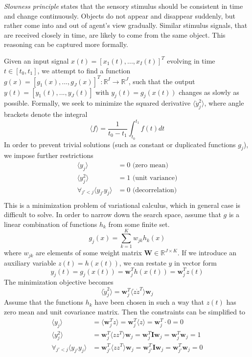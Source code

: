 \documentclass[12pt]{article}
\begin{document}
\textit{Slowness principle} states that the sensory stimulus should be consistent in time and change continuously. Objects do not appear and disappear suddenly, but rather come into and out of agent's view gradually. Similar stimulus signals, that are received closely in time, are likely to come from the same object. This reasoning can be captured more formally. 

Given an input signal $x(t)=[x_1(t),...,x_I(t)]^T$ evolving in time $t\in[t_0,t_1]$, we attempt to find a  function $g(x)=[g_1(x),...,g_J(x)]^T:\mathbb{R}^I\rightarrow \mathbb{R}^J$, such that the output $y(t)=[y_1(t),...,y_J(t)]$ with $y_j(t)=g_j(x(t))$ changes as slowly as possible. 
Formally, we seek to minimize the squared derivative $\langle \dot{y}_j^2 \rangle$,
where angle brackets denote the integral
\[\langle f \rangle = \frac{1}{t_0-t_1} \int_{t_0}^{t_1} f(t) dt\]
In order to prevent trivial solutions (such as constant or duplicated functions $g_j$), we impose further restrictions
\begin{align*}
 \langle y_j \rangle &= 0\text{ (zero mean)}	\\
 \langle y_j^2 \rangle &= 1 \text{ (unit variance)} \\
\forall_{j'< j} \langle y_{j'} y_j \rangle &= 0 \text{ (decorrelation)} \\ 
\end{align*}
This is a minimization problem of variational calculus, which in general case is difficult to solve. In order to narrow down the search space, assume that $g$ is a linear combination of functions $h_k$ from some finite set.
\[
g_j(x) = \sum_{k=1}^K w_{jk} h_k(x)
\] 
where $w_{jk}$ are elements of some weight matrix $\boldsymbol{W}\in \mathbb{R}^{J \times K}$.
If we introduce an auxiliary variable $z(t)=h(x(t))$, we can restate $y$ in vector form 
\[
y_j(t)=g_j(x(t)) = \boldsymbol{w}_j^T h(x(t)) = \boldsymbol{w}_j^T z(t) 
\]
The minimization objective becomes  
\[
\langle \dot{y}_j^2 \rangle = \boldsymbol{w}_j^T \langle \dot{z} \dot{z}^T \rangle \boldsymbol{w}_j
\]
Assume that the functions $h_k$ have been chosen in such a way that $z(t)$ has zero mean and unit covariance matrix. Then the constraints can be simplified to
\begin{align*}
	\langle y_j \rangle &= \langle \boldsymbol{w}_j^T z \rangle = \boldsymbol{w}_j^T  \langle  z \rangle =  \boldsymbol{w}_j^T  \cdot 0 =  0 \\
	\langle y_j^2 \rangle &=  \boldsymbol{w}_j^T \langle z z^T \rangle \boldsymbol{w}_j = \boldsymbol{w}_j^T \textbf{I} \boldsymbol{w}_j = \boldsymbol{w}_j^T \boldsymbol{w}_j  = 1 \\
	\forall_{j' < j} \langle y_{j'} y_j \rangle &= \boldsymbol{w}_{j'}^T \langle z z^T \rangle \boldsymbol{w}_j = \boldsymbol{w}_{j'}^T \textbf{I} \boldsymbol{w}_j = \boldsymbol{w}_{j'}^T \boldsymbol{w}_j = 0 \\ 
\end{align*}
\end{document}
